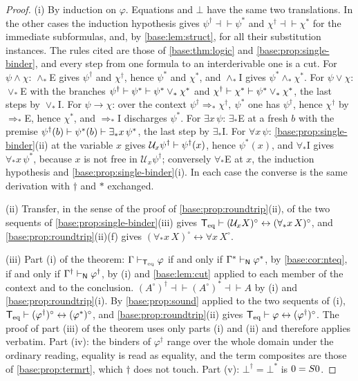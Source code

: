 \begin{proof}
(i) By induction on $\varphi$.  Equations and $\bot$ have the same two
translations.  In the other cases the induction hypothesis gives
$\psi^{\dagger}\dashv\vdash\psi^{*}$ and $\chi^{\dagger}\dashv\vdash\chi^{*}$
for the immediate subformulas, and, by \cref{base:lem:struct}, for all their
substitution instances.  The rules cited are those of \cref{base:thm:logic}
and \cref{base:prop:single-binder}, and every step from one formula to an
interderivable one is a cut.  For $\psi\wedge\chi$: $\wedge_*$E gives
$\psi^{\dagger}$ and $\chi^{\dagger}$, hence $\psi^{*}$ and $\chi^{*}$, and
$\wedge_*$I gives $\psi^{*}\wedge_*\chi^{*}$.  For $\psi\vee\chi$: $\vee_*$E
with the branches $\psi^{\dagger}\vdash\psi^{*}\vdash\psi^{*}\vee_*\chi^{*}$
and $\chi^{\dagger}\vdash\chi^{*}\vdash\psi^{*}\vee_*\chi^{*}$, the last
steps by $\vee_*$I.  For $\psi\to\chi$: over the context
$\psi^{\dagger}\Rightarrow_*\chi^{\dagger},\ \psi^{*}$ one has
$\psi^{\dagger}$, hence $\chi^{\dagger}$ by $\Rightarrow_*$E, hence
$\chi^{*}$, and $\Rightarrow_*$I discharges $\psi^{*}$.  For
$\exists x\,\psi$: $\exists_*$E at a fresh $b$ with the premise
$\psi^{\dagger}(b)\vdash\psi^{*}(b)\vdash\exists_* x\,\psi^{*}$, the last
step by $\exists_*$I.  For $\forall x\,\psi$:
\cref{base:prop:single-binder}(ii) at the variable $x$ gives
$\mathcal U_x\psi^{\dagger}\vdash\psi^{\dagger}(x)$, hence $\psi^{*}(x)$, and
$\forall_*$I gives $\forall_* x\,\psi^{*}$, because $x$ is not free in
$\mathcal U_x\psi^{\dagger}$; conversely $\forall_*$E at $x$, the induction
hypothesis and \cref{base:prop:single-binder}(i).  In each case the
converse is the same derivation with $\dagger$ and $*$ exchanged.

(ii) Transfer, in the sense of the proof of
\cref{base:prop:roundtrip}(ii), of the two sequents of
\cref{base:prop:single-binder}(iii) gives
$\mathsf{T}_{\mathrm{eq}}\vdash(\mathcal U_xX)^\circ\leftrightarrow(\forall_* x\,X)^\circ$, and
\cref{base:prop:roundtrip}(ii)(f) gives
$(\forall_* x\,X)^\circ\leftrightarrow\forall x\,X^\circ$.

(iii) Part (i) of the theorem: $\Gamma\vdash_{\mathsf{T}_{\mathrm{eq}}}\varphi$ if and only if
$\Gamma^{*}\vdash_{\mathsf{N}}\varphi^{*}$, by \cref{base:cor:nteq}, if and only if
$\Gamma^{\dagger}\vdash_{\mathsf{N}}\varphi^{\dagger}$, by (i) and
\cref{base:lem:cut} applied to each member of the context and to the
conclusion.  $(A^\circ)^{\dagger}\dashv\vdash(A^\circ)^{*}\dashv\vdash A$ by (i)
and \cref{base:prop:roundtrip}(i).  By \cref{base:prop:sound} applied to the
two sequents of (i), $\mathsf{T}_{\mathrm{eq}}\vdash(\varphi^{\dagger})^\circ\leftrightarrow
(\varphi^{*})^\circ$, and \cref{base:prop:roundtrip}(ii) gives
$\mathsf{T}_{\mathrm{eq}}\vdash\varphi\leftrightarrow(\varphi^{\dagger})^\circ$.  The proof of
part (iii) of the theorem uses only parts (i) and (ii) and therefore applies
verbatim.  Part (iv): the binders of $\varphi^{\dagger}$ range over the whole
domain under the ordinary reading, equality is read as equality, and the
term composites are those of \cref{base:prop:termrt}, which $\dagger$ does
not touch.  Part (v): $\bot^{\dagger}=\bot^{*}$ is $0=S 0$.
\end{proof}

